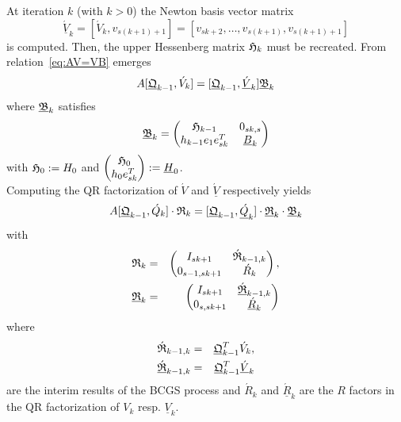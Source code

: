 \documentclass{scrartcl}
\numberwithin{equation}{section}
\begin{document}
At iteration $k$ (with $k > 0$) the Newton basis vector matrix \begin{equation}
 \underline{\acute{V}}_k = [\acute{V}_k, v_{s(k + 1) + 1}] = [v_{sk+2}, \ldots, v_{s(k + 1)}, v_{s(k + 1) + 1}]
\end{equation}
is computed. Then, the upper Hessenberg matrix $\frak{H}_k$ must be recreated. From relation~\eqref{eq:AV=VB} emerges
\begin{equation}
A [\underline{\frak{Q}}_{k - 1}, \acute{V}_k] = [\underline{\frak{Q}}_{k - 1}, \underline{\acute{V}}_k]\underline{\frak{B}}_k
\end{equation}
where $\underline{\frak{B}}_k$ satisfies
\begin{equation} \label{eq:B_blackletter_k_}
\underline{\frak{B}}_k = 
\begin{pmatrix}
	\frak{H}_{k - 1} & 0_{sk, s} \\
	h_{k - 1} e_1 e^T_{sk} & \underline{B}_k \\
\end{pmatrix}
\end{equation}
with $\frak{H}_0 := H_0$ and $
 \begin{pmatrix}
 \frak{H}_0\\
 h_{0} e^T_{sk} 
 \end{pmatrix}
:= \underline{H}_0
$.\\

Computing the QR factorization of $\acute{V}$ and $\underline{\acute{V}}$ respectively yields
\begin{equation*}
A [\underline{\frak{Q}}_{k - 1}, \acute{Q}_k] \cdot 
\frak{R}_k 
= [ \underline{\frak{Q}}_{k - 1}, \underline{\acute{Q}}_k ] \cdot 
\underline{\frak{R}}_k 
 \cdot
\underline{\frak{B}}_k
\end{equation*}
with
\begin{eqnarray*}
\frak{R}_k &=&
\begin{pmatrix}
	I_{sk + 1} & \acute{\frak{R}}_{k - 1, k}\\
	0_{s - 1, sk + 1} & \acute{R}_k\\
\end{pmatrix},\\
\underline{\frak{R}}_k &=&
\begin{pmatrix}
	I_{sk + 1} & \underline{\acute{\frak{R}}}_{k - 1, k}\\
	0_{s, sk + 1} & \underline{\acute{R}}_k\\
\end{pmatrix}
\end{eqnarray*}
where
\begin{eqnarray*}
	\frak{\acute{R}}_{k - 1, k} &=& \underline{\frak{Q}}_{k - 1}^T\acute{V}_k,\\
	\underline{\frak{\acute{R}}}_{k - 1, k} &=& \underline{\frak{Q}}_{k - 1}^T\underline{\acute{V}}_k
\end{eqnarray*}
are the interim results of the BCGS process and $\acute{R}_k$ and $\underline{\acute{R}}_k$ are the $R$ factors in the QR factorization of $V_k$ resp. $\underline{V}_k$.
\end{document}
